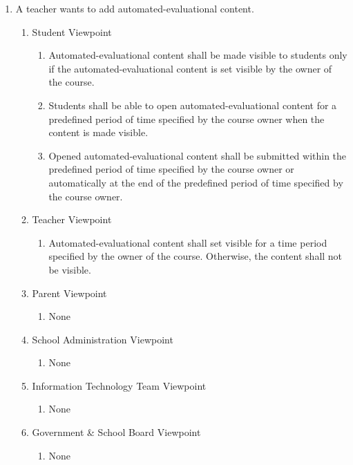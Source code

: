 \documentclass[]{article}
\begin{document}
\begin{enumerate}[{BE}1.]
	\item A teacher wants to add automated-evaluational content.
	\begin{enumerate}[{VP2}.1]
		\item Student Viewpoint
			\begin{enumerate}
				\item Automated-evaluational content shall be made visible to students only 
if the
automated-evaluational content is set visible by the owner of the course.
				\item Students shall be able to open automated-evaluational content for a 
predefined period of time specified by the course owner when the content is made 
visible.
				\item Opened automated-evaluational content shall be submitted within
the predefined period of time specified by the course owner or automatically at
the end of the predefined period of time specified by the course owner.
			\end{enumerate}
		\item Teacher Viewpoint
			\begin{enumerate}
				\item Automated-evaluational content shall set visible for a time period
specified by the owner of the course. Otherwise, the content shall not be 
visible.
			\end{enumerate}
		\item Parent Viewpoint
			\begin{enumerate}
				\item None
			\end{enumerate}
		\item School Administration Viewpoint
			\begin{enumerate}
				\item None
			\end{enumerate}
		\item Information Technology Team Viewpoint
			\begin{enumerate}
				\item None
			\end{enumerate}
		\item Government \& School Board Viewpoint
			\begin{enumerate}
				\item None
			\end{enumerate}
	\end{enumerate}


\end{enumerate}
\end{document}
